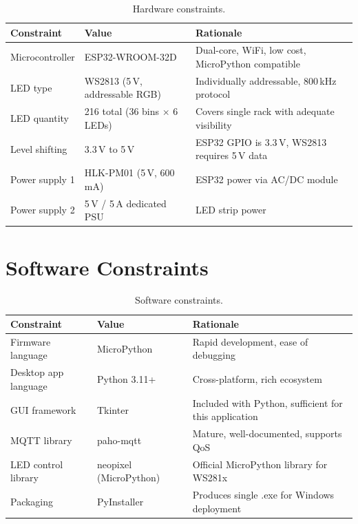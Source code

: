\begin{table}[H]
  \centering
  \caption{Hardware constraints.}
  \label{tab:hw-constraints}
  \begin{tabular}{p{3cm} p{4cm} p{5cm}}
    \toprule
    \textbf{Constraint} & \textbf{Value} & \textbf{Rationale} \\
    \midrule
    Microcontroller & ESP32-WROOM-32D\cite{esp32_trm} & Dual-core, WiFi, low cost, MicroPython compatible \\
    LED type & WS2813\cite{ws2813_ds} (5\,V, addressable RGB) & Individually addressable, 800\,kHz protocol \\
    LED quantity & 216 total (36 bins $\times$ 6 LEDs) & Covers single rack with adequate visibility \\
    Level shifting & 3.3\,V to 5\,V & ESP32 GPIO is 3.3\,V, WS2813 requires 5\,V data \\
    Power supply 1 & HLK-PM01\cite{hlkpm01_ds} (5\,V, 600\,mA) & ESP32 power via AC/DC module \\
    Power supply 2 & 5\,V / 5\,A dedicated PSU & LED strip power \\
    \bottomrule
  \end{tabular}
\end{table}

\section{Software Constraints}
\label{sec:sw-constraints}

\begin{table}[H]
  \centering
  \caption{Software constraints.}
  \label{tab:sw-constraints}
  \begin{tabular}{p{3cm} p{4cm} p{5cm}}
    \toprule
    \textbf{Constraint} & \textbf{Value} & \textbf{Rationale} \\
    \midrule
    Firmware language & MicroPython & Rapid development, ease of debugging \\
    Desktop app language & Python 3.11+ & Cross-platform, rich ecosystem \\
    GUI framework & Tkinter & Included with Python, sufficient for this application \\
    MQTT library & paho-mqtt & Mature, well-documented, supports QoS \\
    LED control library & neopixel (MicroPython) & Official MicroPython library for WS281x \\
    Packaging & PyInstaller & Produces single .exe for Windows deployment \\
    \bottomrule
  \end{tabular}
\end{table}

